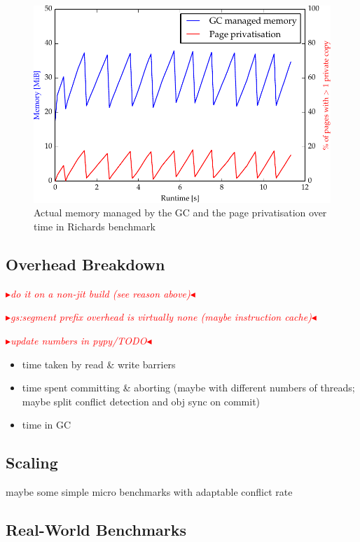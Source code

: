 \documentclass{sigplanconf}
\newcommand{\mynote}[2]{%
  \textcolor{red}{%
    \fbox{\bfseries\sffamily\scriptsize#1}%
    {\small$\blacktriangleright$\textsf{\emph{#2}}$\blacktriangleleft$}%
  }%
}
\newcommand\remi[1]{\mynote{Remi}{#1}}
\begin{document}
\begin{figure}[h]
  \centering
  \includegraphics[width=1\columnwidth]{plots/richards_mem.pdf}
  \caption{Actual memory managed by the GC and the page privatisation
    over time in Richards benchmark\label{fig:richards_mem}}
\end{figure}


\subsection{Overhead Breakdown}

\remi{do it on a non-jit build (see reason above)}
\remi{gs:segment prefix overhead is virtually none (maybe instruction cache)}
\remi{update numbers in pypy/TODO}

\begin{itemize}
\item time taken by read \& write barriers
\item time spent committing \& aborting (maybe with different numbers
  of threads; maybe split conflict detection and obj sync on commit)
\item time in GC
\end{itemize}


\subsection{Scaling}

maybe some simple micro benchmarks with adaptable conflict rate


\subsection{Real-World Benchmarks\label{sec:real-world-bench}}
\end{document}
